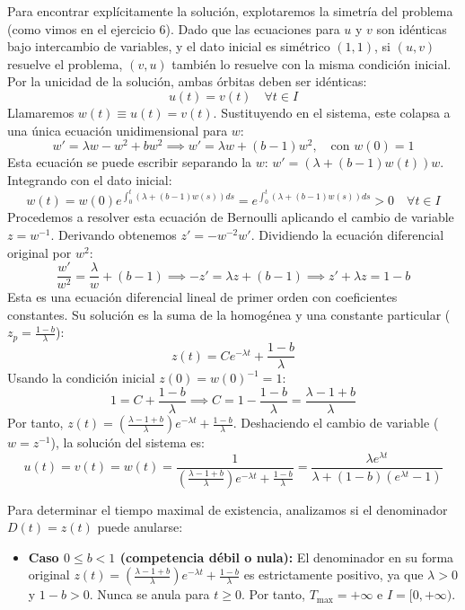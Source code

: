 {    Para encontrar explícitamente la solución, explotaremos la simetría del problema (como vimos en el ejercicio 6). Dado que las ecuaciones para $u$ y $v$ son idénticas bajo intercambio de variables, y el dato inicial es simétrico $(1,1)$, si $(u,v)$ resuelve el problema, $(v,u)$ también lo resuelve con la misma condición inicial. Por la unicidad de la solución, ambas órbitas deben ser idénticas:
    \[
        u(t) = v(t) \quad \forall t \in I
    \]
    Llamaremos $w(t) \equiv u(t) = v(t)$. Sustituyendo en el sistema, este colapsa a una única ecuación unidimensional para $w$:
    \[
        w' = \lambda w - w^2 + bw^2 \implies w' = \lambda w + (b-1)w^2, \quad \text{con } w(0) = 1
    \]
    Esta ecuación se puede escribir separando la $w$: $w' = (\lambda + (b-1)w(t))w$. Integrando con el dato inicial:
    \[
        w(t) = w(0) e^{\int_0^t (\lambda + (b-1)w(s)) ds} = e^{\int_0^t (\lambda + (b-1)w(s)) ds} > 0 \quad \forall t \in I
    \]
    Procedemos a resolver esta ecuación de Bernoulli aplicando el cambio de variable $z = w^{-1}$. Derivando obtenemos $z' = -w^{-2} w'$. Dividiendo la ecuación diferencial original por $w^2$:
    \[
        \frac{w'}{w^2} = \frac{\lambda}{w} + (b-1) \implies -z' = \lambda z + (b-1) \implies z' + \lambda z = 1 - b
    \]
    Esta es una ecuación diferencial lineal de primer orden con coeficientes constantes. Su solución es la suma de la homogénea y una constante particular ($z_p = \frac{1-b}{\lambda}$):
    \[
        z(t) = C e^{-\lambda t} + \frac{1-b}{\lambda}
    \]
    Usando la condición inicial $z(0) = w(0)^{-1} = 1$:
    \[
        1 = C + \frac{1-b}{\lambda} \implies C = 1 - \frac{1-b}{\lambda} = \frac{\lambda - 1 + b}{\lambda}
    \]
    Por tanto, $z(t) = \left(\frac{\lambda - 1 + b}{\lambda}\right) e^{-\lambda t} + \frac{1-b}{\lambda}$. Deshaciendo el cambio de variable ($w = z^{-1}$), la solución del sistema es:
    \[
        u(t) = v(t) = w(t) = \frac{1}{\left(\frac{\lambda - 1 + b}{\lambda}\right) e^{-\lambda t} + \frac{1-b}{\lambda}} = \frac{\lambda e^{\lambda t}}{\lambda + (1 - b)(e^{\lambda t} - 1)}
    \]

    Para determinar el tiempo maximal de existencia, analizamos si el denominador $D(t) = z(t)$ puede anularse:
    \begin{itemize}
        \item \textbf{Caso $0 \le b < 1$ (competencia débil o nula):}
        El denominador en su forma original $z(t) = \left(\frac{\lambda - 1 + b}{\lambda}\right) e^{-\lambda t} + \frac{1-b}{\lambda}$ es estrictamente positivo, ya que $\lambda > 0$ y $1-b > 0$. Nunca se anula para $t \ge 0$. Por tanto, $T_{\max} = +\infty$ e $I = [0, +\infty)$.
        

\end{itemize}}
